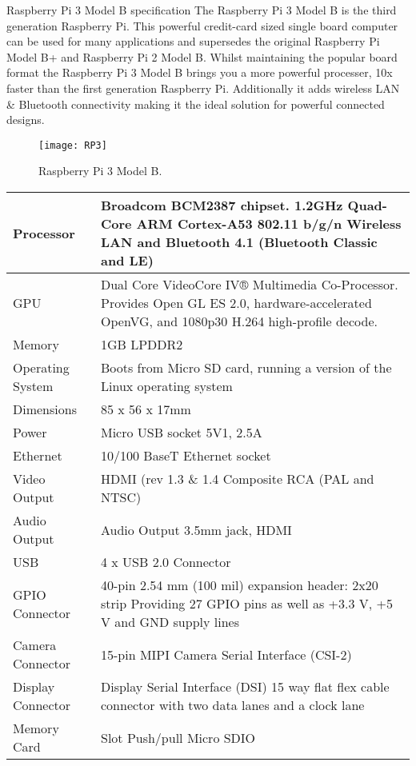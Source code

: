 	Raspberry Pi 3 Model B specification
	The Raspberry Pi 3 Model B is the third generation Raspberry Pi. This powerful credit-card sized single board computer can be used for many applications and supersedes the original Raspberry Pi Model B+ and Raspberry Pi 2 Model B. Whilst maintaining the popular board format the Raspberry Pi 3 Model	B brings you a more powerful processer, 10x faster than the first generation Raspberry Pi. Additionally it adds wireless LAN \& Bluetooth connectivity making it the ideal solution for powerful connected designs.
\begin{figure}[h]
\centering
\texttt{[image: RP3]}
\caption{Raspberry Pi 3 Model B.}
\label{Fig:RP3}
\end{figure}
\begin{center}
\begin{tabular}{ |l||p{12cm}|}
	\hline
	Processor      & Broadcom BCM2387 chipset. 1.2GHz Quad-Core ARM Cortex-A53 802.11 b/g/n Wireless LAN and Bluetooth 4.1 (Bluetooth Classic and LE)\\ \hline
	GPU               & Dual Core VideoCore IV® Multimedia Co-Processor. Provides Open GL ES 2.0, hardware-accelerated OpenVG, and 1080p30 H.264 high-profile decode. \\ \hline
	Memory          & 1GB LPDDR2  \\ \hline
	Operating System  & Boots from Micro SD card, running a version of the Linux operating system  \\ \hline
	Dimensions     & 85 x 56 x 17mm  \\ \hline
	Power             & Micro USB socket 5V1, 2.5A  \\ \hline
	Ethernet          & 10/100 BaseT Ethernet socket  \\ \hline
	Video Output   & HDMI (rev 1.3 \& 1.4 Composite RCA (PAL and NTSC)  \\ \hline
	Audio Output   & Audio Output 3.5mm jack, HDMI     \\ \hline
	USB                 & 4 x USB 2.0 Connector   \\ \hline
	GPIO Connector    & 40-pin 2.54 mm (100 mil) expansion header: 2x20 strip Providing 27 GPIO pins as well as +3.3 V, +5 V and GND supply lines \\ \hline
	Camera Connector  & 15-pin MIPI Camera Serial Interface (CSI-2) \\ \hline
	Display Connector & Display Serial Interface (DSI) 15 way flat flex cable connector with two data lanes and a clock lane    \\ \hline
	Memory Card       & Slot Push/pull Micro SDIO  \\ \hline
\end{tabular}
\end{center}

